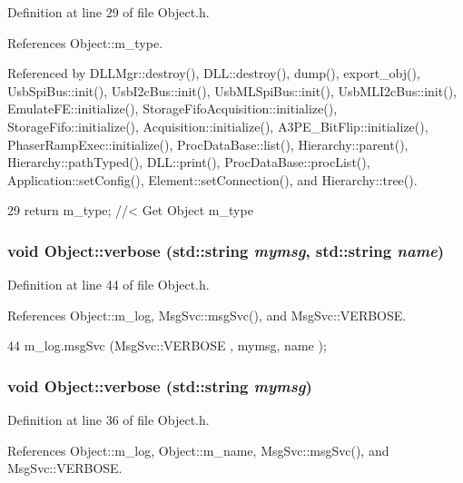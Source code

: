 Definition at line 29 of file Object.h.

References Object::m\_\-type.

Referenced by DLLMgr::destroy(), DLL::destroy(), dump(), export\_\-obj(), UsbSpiBus::init(), UsbI2cBus::init(), UsbMLSpiBus::init(), UsbMLI2cBus::init(), EmulateFE::initialize(), StorageFifoAcquisition::initialize(), StorageFifo::initialize(), Acquisition::initialize(), A3PE\_\-BitFlip::initialize(), PhaserRampExec::initialize(), ProcDataBase::list(), Hierarchy::parent(), Hierarchy::pathTyped(), DLL::print(), ProcDataBase::procList(), Application::setConfig(), Element::setConnection(), and Hierarchy::tree().


\begin{DoxyCode}
29 { return m_type;       } //< Get Object m_type
\end{DoxyCode}
\hypertarget{classObject_a2d4120195317e2a3c6532e8bb9f3da68}{
\subsubsection[{verbose}]{\setlength{\rightskip}{0pt plus 5cm}void Object::verbose (std::string {\em mymsg}, \/  std::string {\em name})}}
\label{classObject_a2d4120195317e2a3c6532e8bb9f3da68}


Definition at line 44 of file Object.h.

References Object::m\_\-log, MsgSvc::msgSvc(), and MsgSvc::VERBOSE.


\begin{DoxyCode}
44 { m_log.msgSvc (MsgSvc::VERBOSE , mymsg, name ); }
\end{DoxyCode}
\hypertarget{classObject_a83d2db2df682907ea1115ad721c1c4a1}{
\subsubsection[{verbose}]{\setlength{\rightskip}{0pt plus 5cm}void Object::verbose (std::string {\em mymsg})}}
\label{classObject_a83d2db2df682907ea1115ad721c1c4a1}


Definition at line 36 of file Object.h.

References Object::m\_\-log, Object::m\_\-name, MsgSvc::msgSvc(), and MsgSvc::VERBOSE.

